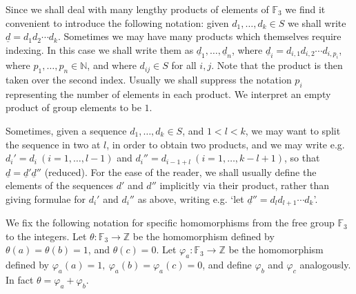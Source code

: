 \documentclass[twoside,11pt]{amsart}
\numberwithin{equation}{section}
\theoremstyle{definition}
\newcommand {\N}{\mathbb N}
\newcommand {\Z}{\mathbb Z}
\newcommand{\1}{\mathbbm{1}}
\newcommand{\F}{\mathbb F}
\newcommand{\pdt}{\underline}
\begin{document}
	Since we shall deal with many lengthy products of elements of $\F_3$ we find it convenient to introduce the following notation: given $d_1,\ldots, d_k \in S$ we shall write $\pdt{d} = d_1d_2\cdots d_k$. Sometimes we may have many products which themselves require indexing. In this case we shall write them as $\pdt{d}_1, \ldots, \pdt{d}_n$, where $\pdt{d}_i = d_{i, 1}d_{i,2}\cdots d_{i,p_i}$, where $p_1, \ldots, p_n \in \N$, and where $d_{ij} \in S$ for all $i,j$. Note that the product is then taken over the second index. Usually we shall suppress the notation $p_i$ representing the number of elements in each product. We interpret an empty product of group elements to be $1$. 
	
	Sometimes, given a sequence $d_1, \ldots, d_k \in S$, and $1<l<k$, we may want to split the sequence in two at $l$, in order to obtain two products, and we may write e.g. $d_i' = d_i \ (i =1, \ldots, l-1)$ and $d_i'' = d_{i-1+l} \ (i=1, \ldots, k-l+1)$, so that $\pdt{d} = \pdt{d}' \pdt{d}''$ (reduced). For the ease of the reader, we shall usually define the elements of the sequences $d'$ and $d''$ implicitly via their product, rather than giving formulae for $d_i'$ and $d_i''$ as above, writing e.g. `let $\pdt{d}'' = d_l d_{l+1}\cdots d_k$'.
	
	We fix the following notation for specific homomorphisms from the free group $\F_3$ to the integers.	Let $\theta \colon \F_3 \to \Z$ be the homomorphism defined by $\theta(a) = \theta(b) = 1$, and $\theta(c) = 0$. Let $\varphi_a \colon \F_3 \to \Z$ be the homomorphism defined by $\varphi_a(a) = 1, \ \varphi_a(b) = \varphi_a(c) = 0$, and define $\varphi_b$ and $\varphi_c$ analogously. In fact $\theta = \varphi_a + \varphi_b$.
	
	
	
\end{document}
